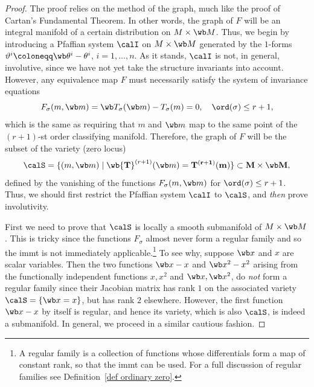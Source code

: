 \begin{proof}
    The proof relies on the method of the graph, much like the proof of Cartan's Fundamental Theorem. In other words, the graph of $F$ will be an integral manifold of a certain distribution on $M\times \wb M$. Thus, we begin by introducing a Pfaffian system $\calI$ on $M\times \wb M$ generated by the $1$-forms $\vartheta^i\coloneqq \wb\theta^i-\theta^i$, $i=1,\ldots,n$. As it stands, $\calI$ is not, in general, involutive, since we have not yet take the structure invariants into account. However, any equivalence map $F$ must necessarily satisfy the system of invariance equations 
    \[F_\sigma(m,\wb m)=\wb T_\sigma(\wb m)-T_\sigma(m)=0,\quad \ord(\sigma)\leq r+1,\label{eq 14.24 Olver93}\]
    which is the same as requiring that $m$ and $\wb m$ map to the same point of the $(r+1)$-st order classifying manifold. Therefore, the graph of $F$ will be the subset of the variety (zero locus)
    \[\calS=\{(m,\wb m)\mid \wb{\bf T}^{(r+1)}(\wb m)=\bf{T}^{(r+1)}(m)\}\subset M\times\wb M,\]
    defined by the vanishing of the functions $F_\sigma(m,\wb m)$ for $\ord(\sigma)\leq r+1$. Thus, we should first restrict the Pfaffian system $\calI$ to $\calS$, and \emph{then} prove involutivity.

    First we need to prove that $\calS$ is locally a smooth submanifold of $M\times \wb M$. This is tricky since the functions $F_\sigma$ almost never form a regular family and so the \gls{immt} is not immediately applicable.\footnote{A regular family is a collection of functions whose differentials form a map of constant rank, so that the \gls{immt} can be used. For a full discussion of regular families see Definition~\ref{def ordinary zero}.} To see why, suppose $\wb x$ and $x$ are scalar variables. Then the two functions $\wb x-x$ and $\wb x^2-x^2$ arising from the functionally independent functions $x,x^2$ and $\wb x,\wb x^2$, do \emph{not} form a regular family since their Jacobian matrix has rank $1$ on the associated variety $\calS=\{\wb x=x\}$, but has rank $2$ elsewhere. However, the first function $\wb x-x$ by itself is regular, and hence its variety, which is also $\calS$, is indeed a submanifold. In general, we proceed in a similar cautious fashion.


\end{proof}
